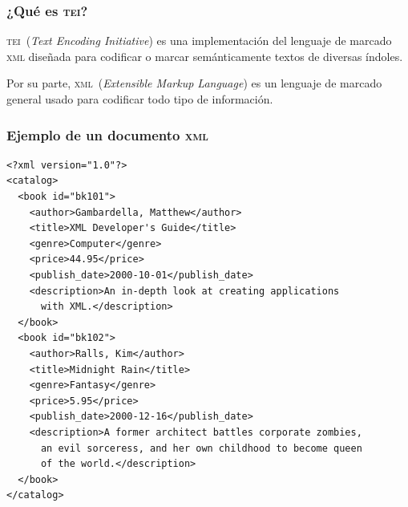 \documentclass[%
  handout, %
  ]{beamer}
\newcommand*{\rojo}[1]{\textcolor[HTML]{8B0000}{#1}}
\newcommand*{\azul}[1]{\textcolor{bluenivaca}{#1}}
\newcommand*{\TEI}{\textsc{tei}}
\newcommand*{\XML}{\textsc{xml}}
\begin{document}
\begin{frame}
  \frametitle{¿Qué es \TEI?}

\large\centering
  
\rojo{\TEI\ ({\small\textit{Text Encoding Initiative}})} es una implementación del lenguaje de marcado \azul{\XML} diseñada para codificar o marcar semánticamente textos de diversas índoles.

\bigskip

Por su parte, \azul{\XML\ ({\small\textit{Extensible Markup Language}})} es un lenguaje de marcado general usado para codificar todo tipo de información.
\end{frame}


\begin{frame}[fragile]
  \frametitle{Ejemplo de un documento \XML}
\scriptsize
  \begin{verbatim}
<?xml version="1.0"?>
<catalog>
  <book id="bk101">
    <author>Gambardella, Matthew</author>
    <title>XML Developer's Guide</title>
    <genre>Computer</genre>
    <price>44.95</price>
    <publish_date>2000-10-01</publish_date>
    <description>An in-depth look at creating applications 
      with XML.</description>
  </book>
  <book id="bk102">
    <author>Ralls, Kim</author>
    <title>Midnight Rain</title>
    <genre>Fantasy</genre>
    <price>5.95</price>
    <publish_date>2000-12-16</publish_date>
    <description>A former architect battles corporate zombies, 
      an evil sorceress, and her own childhood to become queen 
      of the world.</description>
  </book>
</catalog>
  \end{verbatim}
\end{frame}
\end{document}
